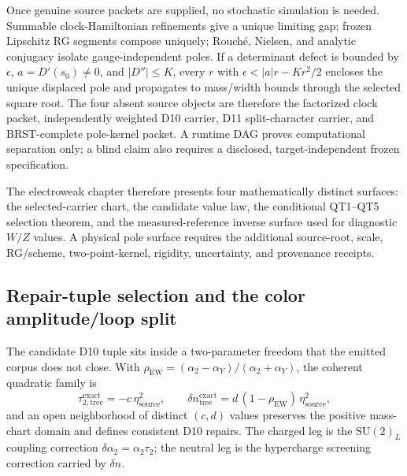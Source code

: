 \documentclass[11pt]{article}
\newcommand{\SU}{\mathrm{SU}}
\begin{document}
Once genuine source packets are supplied, no stochastic simulation is needed.
Summable clock-Hamiltonian refinements give a unique limiting gap; frozen
Lipschitz RG segments compose uniquely; Rouch\'e, Nielsen, and analytic
conjugacy isolate gauge-independent poles. If a determinant defect is bounded
by \(\epsilon\), \(a=D'(s_0)\ne0\), and \(|D''|\le K\), every $r$ with
\(\epsilon<|a|r-Kr^2/2\) encloses the unique displaced pole and propagates to
mass/width bounds through the selected square root. The four absent source
objects are therefore the factorized clock packet, independently weighted
D10 carrier, D11 split-character carrier, and BRST-complete pole-kernel packet.
A runtime DAG proves computational separation only; a blind claim also requires a disclosed,
target-independent frozen specification.

The electroweak chapter therefore presents four mathematically distinct
surfaces: the selected-carrier chart, the candidate value law, the
conditional QT1--QT5 selection theorem, and the
measured-reference inverse surface used for diagnostic \(W/Z\) values.  A physical
pole surface requires the additional source-root, scale, RG/scheme,
two-point-kernel, rigidity, uncertainty, and provenance receipts.

\subsection{Repair-tuple selection and the color amplitude/loop split}\label{ew-repair-tuple-selection}

The candidate D10 tuple sits inside a two-parameter freedom that the emitted
corpus does not close.  With
\(\rho_{\mathrm{EW}}=(\alpha_2-\alpha_Y)/(\alpha_2+\alpha_Y)\), the coherent
quadratic family is
\[
\tau_{2,\mathrm{tree}}^{\mathrm{exact}}=-c\,\eta_{\mathrm{source}}^2,
\qquad
\delta n_{\mathrm{tree}}^{\mathrm{exact}}=d\,(1-\rho_{\mathrm{EW}})\,\eta_{\mathrm{source}}^2,
\]
and an open neighborhood of distinct \((c,d)\) values preserves the positive
mass-chart domain and defines consistent D10 repairs. The charged leg is the
\(\SU(2)_L\) coupling correction \(\delta\alpha_2=\alpha_2\tau_2\); the neutral leg is the
hypercharge screening correction carried by \(\delta n\).
\end{document}

